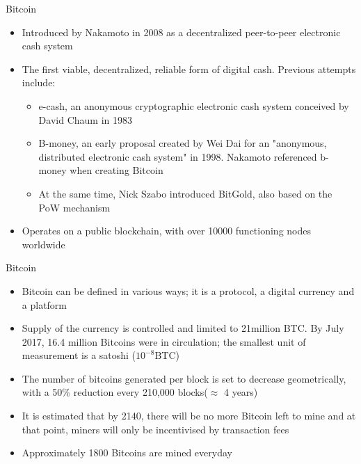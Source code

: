 \documentclass[9pt]{beamer}
\begin{document}

\begin{frame}{Bitcoin}
	\begin{itemize}
		\item Introduced by Nakamoto in 2008 as a decentralized peer-to-peer electronic cash system
		\item The first viable, decentralized, reliable form of digital cash. Previous attempts include:
		\begin{itemize}
			\item e-cash, an anonymous cryptographic electronic cash system conceived by David Chaum in 1983
			\item B-money, an early proposal created by Wei Dai for an "anonymous, distributed electronic cash system" in 1998. Nakamoto referenced b-money when creating Bitcoin
			\item At the same time, Nick Szabo introduced BitGold, also based on the PoW mechanism
		\end{itemize}
		\item Operates on a public blockchain, with over 10000 functioning nodes worldwide
	\end{itemize}
\end{frame}



\begin{frame}{Bitcoin}
	\begin{itemize}
		\item Bitcoin can be defined in various ways; it is a protocol, a digital currency and a platform
		\item Supply of the currency is controlled and limited to 21million BTC. By July 2017, 16.4 million Bitcoins were in circulation; the smallest unit of measurement is a satoshi ($ 10^{-8}$BTC)
		\item The number of bitcoins generated per block is set to decrease geometrically, with a 50\% reduction every 210,000 blocks($\approx$ 4 years)
		\item It is estimated that by 2140, there will be no more Bitcoin left to mine and at that point, miners will only be incentivised by transaction fees
		\item Approximately 1800 Bitcoins are mined everyday
		\end{itemize}
\end{frame}
\end{document}
